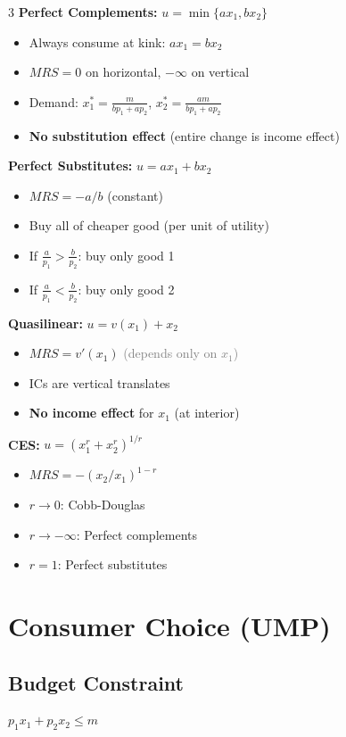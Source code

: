 \documentclass[10pt,landscape]{article}
\newcommand{\note}[1]{\textcolor{gray}{\small(#1)}}
\begin{document}
\begin{multicols}{3}
\textbf{Perfect Complements:} $u = \min\{ax_1, bx_2\}$
\begin{itemize}[leftmargin=*,noitemsep]
\item Always consume at kink: $ax_1 = bx_2$
\item $MRS = 0$ on horizontal, $-\infty$ on vertical
\item Demand: $x_1^* = \frac{m}{bp_1 + ap_2}$, $x_2^* = \frac{am}{bp_1 + ap_2}$
\item \textbf{No substitution effect} (entire change is income effect)
\end{itemize}

\textbf{Perfect Substitutes:} $u = ax_1 + bx_2$
\begin{itemize}[leftmargin=*,noitemsep]
\item $MRS = -a/b$ (constant)
\item Buy all of cheaper good (per unit of utility)
\item If $\frac{a}{p_1} > \frac{b}{p_2}$: buy only good 1
\item If $\frac{a}{p_1} < \frac{b}{p_2}$: buy only good 2
\end{itemize}

\textbf{Quasilinear:} $u = v(x_1) + x_2$
\begin{itemize}[leftmargin=*,noitemsep]
\item $MRS = v'(x_1)$ \note{depends only on $x_1$}
\item ICs are vertical translates
\item \textbf{No income effect} for $x_1$ (at interior)
\end{itemize}

\textbf{CES:} $u = (x_1^r + x_2^r)^{1/r}$
\begin{itemize}[leftmargin=*,noitemsep]
\item $MRS = -(x_2/x_1)^{1-r}$
\item $r \to 0$: Cobb-Douglas
\item $r \to -\infty$: Perfect complements
\item $r = 1$: Perfect substitutes
\end{itemize}

\section{Consumer Choice (UMP)}

\subsection{Budget Constraint}
$p_1 x_1 + p_2 x_2 \leq m$


\end{multicols}
\end{document}

